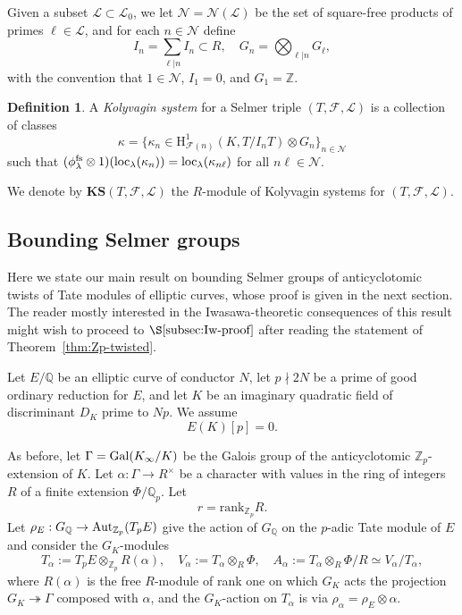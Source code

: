 \documentclass[10pt]{amsart}
\numberwithin{equation}{section}
\theoremstyle{definition}
\newtheorem{definition}[theorem]{Definition}
\theoremstyle{remark}
\newcommand{\Z}{\mathbb{Z}}
\newcommand{\cL}{\mathscr{L}}
\newcommand{\cN}{\mathscr{N}}
\newcommand{\Fcal}{\mathcal{F}}
\newcommand{\bZ}{\mathbb{Z}}
\newcommand{\bQ}{\mathbb{Q}}
\newcommand{\Q}{\mathbb{Q}}
\newcommand{\rH}{\mathrm{H}}
\newcommand{\rank}{\mathrm{rank}}
\begin{document}
Given a subset $\cL\subset\cL_0$, we let $\cN=\cN(\cL)$ be the set of square-free products of primes $\ell\in\cL$, and for each $n\in\cN$ define
\[
I_n=\sum_{\ell\vert n}I_n\subset R,\quad G_n=\bigotimes_{\ell\vert n}G_\ell,
\]
with the convention that $1\in\cN$, $I_1=0$, and $G_1=\Z$.

\begin{definition}
A \emph{Kolyvagin system} for a Selmer triple $(T,\Fcal,\cL)$ is a collection of classes
\[
\kappa=\{\kappa_n\in\rH^1_{\Fcal(n)}(K,T/I_nT)\otimes G_n\}_{n\in\cN}
\]
such that 
$(\phi_\lambda^{\rm fs}\otimes 1)({\rm loc}_\lambda(\kappa_n))={\rm loc}_\lambda(\kappa_{n\ell})$ for all $n\ell\in\cN$.
\end{definition}

We denote by $\mathbf{KS}(T,\Fcal,\cL)$ the $R$-module of Kolyvagin systems for $(T,\Fcal,\cL)$.


\subsection{Bounding Selmer groups}\label{sec:Zp-twisted} 

Here we state our main result on bounding Selmer groups of anticyclotomic twists of Tate modules of elliptic curves, whose proof is given in the next section. The reader mostly interested in the Iwasawa-theoretic consequences of this result might wish to proceed to $\S\ref{subsec:Iw-proof}$ after reading the statement of Theorem~\ref{thm:Zp-twisted}.

Let $E/\Q$ be an elliptic curve of conductor $N$, let $p\nmid 2N$ be a prime of good ordinary reduction for $E$, and let $K$ be an imaginary quadratic field of discriminant $D_K$  prime to $Np$. We assume 
\begin{equation}\label{eq:h1}
E(K)[p]=0.\tag{h1}
\end{equation}

As  before, let $\Gamma={\rm Gal}(K_\infty/K)$ be the Galois group of the anticyclotomic $\Z_p$-extension of $K$.
Let $\alpha:\Gamma\rightarrow R^\times$ be a character with values in the ring of integers $R$ of a finite extension $\Phi/\Q_p$. Let 
\[
r=\rank_{\Z_p}R.
\] 
Let $\rho_E:G_{\bQ}\rightarrow{\rm Aut}_{\bZ_p}(T_pE)$ give the action of $G_\bQ$ on the $p$-adic Tate module of $E$ and consider the $G_K$-modules
\begin{equation}
T_\alpha:=T_pE\otimes_{\bZ_p}R(\alpha),\quad
V_\alpha:=T_\alpha\otimes_R\Phi,\quad A_\alpha:=T_\alpha\otimes_R\Phi/R\simeq V_\alpha/T_\alpha,\nonumber
\end{equation}
where $R(\alpha)$ is the free $R$-module of rank one on which $G_K$ acts the projection $G_K\twoheadrightarrow\Gamma$ composed with $\alpha$, and the $G_K$-action on $T_\alpha$ is via $\rho_\alpha = \rho_E\otimes\alpha$. 
\end{document}
